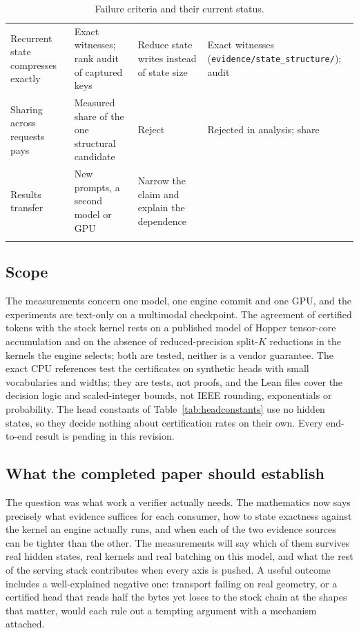 \begin{longtable}{@{}P{3.1cm}P{4.1cm}P{4.3cm}P{2.6cm}@{}}
Recurrent state compresses exactly & Exact witnesses; rank audit of captured keys & Reduce state writes instead of state size & Exact witnesses (\nolinkurl{evidence/state_structure/}); audit \pending{}\\
Sharing across requests pays & Measured share of the one structural candidate & Reject & Rejected in analysis; share \pending{}\\
Results transfer & New prompts, a second model or GPU & Narrow the claim and explain the dependence & \pending{}\\\bottomrule
\caption{Failure criteria and their current status.}\label{tab:failures}
\end{longtable}

\subsection{Scope}
The measurements concern one model, one engine commit and one GPU, and the experiments are text-only on a multimodal checkpoint. The agreement of certified tokens with the stock kernel rests on a published model of Hopper tensor-core accumulation and on the absence of reduced-precision split-$K$ reductions in the kernels the engine selects; both are tested, neither is a vendor guarantee. The exact CPU references test the certificates on synthetic heads with small vocabularies and widths; they are tests, not proofs, and the Lean files cover the decision logic and scaled-integer bounds, not IEEE rounding, exponentials or probability. The head constants of Table~\ref{tab:headconstants} use no hidden states, so they decide nothing about certification rates on their own. Every end-to-end result is pending in this revision.

\subsection{What the completed paper should establish}\label{sec:conclusion}
The question was what work a verifier actually needs. The mathematics now says precisely what evidence suffices for each consumer, how to state exactness against the kernel an engine actually runs, and when each of the two evidence sources can be tighter than the other. The measurements will say which of them survives real hidden states, real kernels and real batching on this model, and what the rest of the serving stack contributes when every axis is pushed. A useful outcome includes a well-explained negative one: transport failing on real geometry, or a certified head that reads half the bytes yet loses to the stock chain at the shapes that matter, would each rule out a tempting argument with a mechanism attached.
